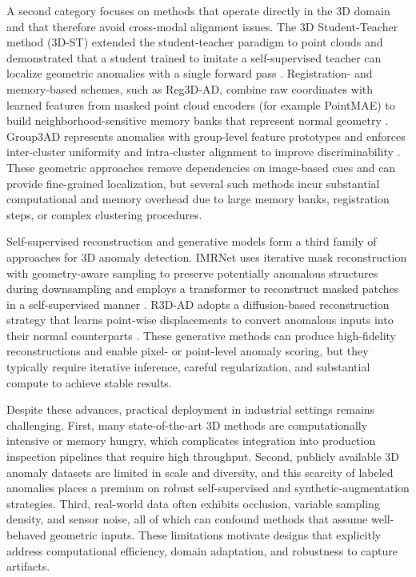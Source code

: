 A second category focuses on methods that operate directly in the 3D domain and that therefore avoid cross-modal alignment issues. The 3D Student-Teacher method (3D-ST) extended the student-teacher paradigm to point clouds and demonstrated that a student trained to imitate a self-supervised teacher can localize geometric anomalies with a single forward pass \cite{bergmann2023anomaly}. Registration- and memory-based schemes, such as Reg3D-AD, combine raw coordinates with learned features from masked point cloud encoders (for example PointMAE) to build neighborhood-sensitive memory banks that represent normal geometry \cite{liu2023real3d}. Group3AD represents anomalies with group-level feature prototypes and enforces inter-cluster uniformity and intra-cluster alignment to improve discriminability \cite{zhu2024towards}. These geometric approaches remove dependencies on image-based cues and can provide fine-grained localization, but several such methods incur substantial computational and memory overhead due to large memory banks, registration steps, or complex clustering procedures.

Self-supervised reconstruction and generative models form a third family of approaches for 3D anomaly detection. IMRNet uses iterative mask reconstruction with geometry-aware sampling to preserve potentially anomalous structures during downsampling and employs a transformer to reconstruct masked patches in a self-supervised manner \cite{li2024towards}. R3D-AD adopts a diffusion-based reconstruction strategy that learns point-wise displacements to convert anomalous inputs into their normal counterparts \cite{zhou2024r3d}. These generative methods can produce high-fidelity reconstructions and enable pixel- or point-level anomaly scoring, but they typically require iterative inference, careful regularization, and substantial compute to achieve stable results.

Despite these advances, practical deployment in industrial settings remains challenging. First, many state-of-the-art 3D methods are computationally intensive or memory hungry, which complicates integration into production inspection pipelines that require high throughput. Second, publicly available 3D anomaly datasets are limited in scale and diversity, and this scarcity of labeled anomalies places a premium on robust self-supervised and synthetic-augmentation strategies. Third, real-world data often exhibits occlusion, variable sampling density, and sensor noise, all of which can confound methods that assume well-behaved geometric inputs. These limitations motivate designs that explicitly address computational efficiency, domain adaptation, and robustness to capture artifacts.

